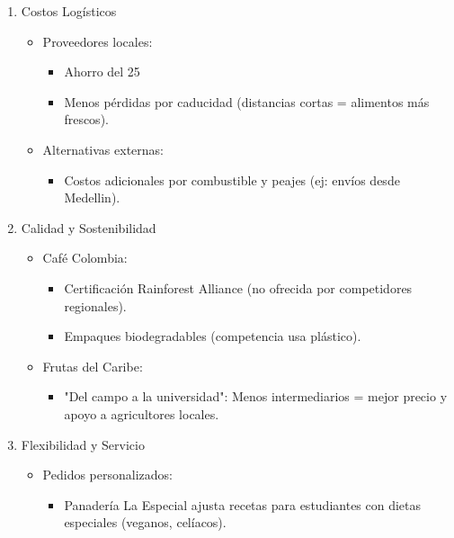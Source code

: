 \documentclass[letterpaper, 11pt]{report}
\begin{document}
\begin{enumerate}
      \item Costos Logísticos \begin{itemize}
                  \item Proveedores locales: \begin{itemize}
                              \item Ahorro del 25%
                              \item Menos pérdidas por caducidad (distancias cortas = alimentos más frescos).

                        \end{itemize}

                  \item Alternativas externas: \begin{itemize}
                              \item Costos adicionales por combustible y peajes (ej: envíos desde Medellin).
                        \end{itemize}
            \end{itemize}

      \item Calidad y Sostenibilidad \begin{itemize}
                  \item Café Colombia: \begin{itemize}
                              \item Certificación Rainforest Alliance (no ofrecida por competidores regionales).
                              \item Empaques biodegradables (competencia usa plástico).
                        \end{itemize}

                  \item Frutas del Caribe: \begin{itemize}
                              \item "Del campo a la universidad": Menos intermediarios = mejor precio y apoyo a agricultores locales.
                        \end{itemize}
            \end{itemize}

      \item Flexibilidad y Servicio \begin{itemize}
                  \item Pedidos personalizados: \begin{itemize}
                              \item Panadería La Especial ajusta recetas para estudiantes con dietas especiales
                                    (veganos, celíacos).
                        \end{itemize}


\end{itemize}
\end{enumerate}
\end{document}
